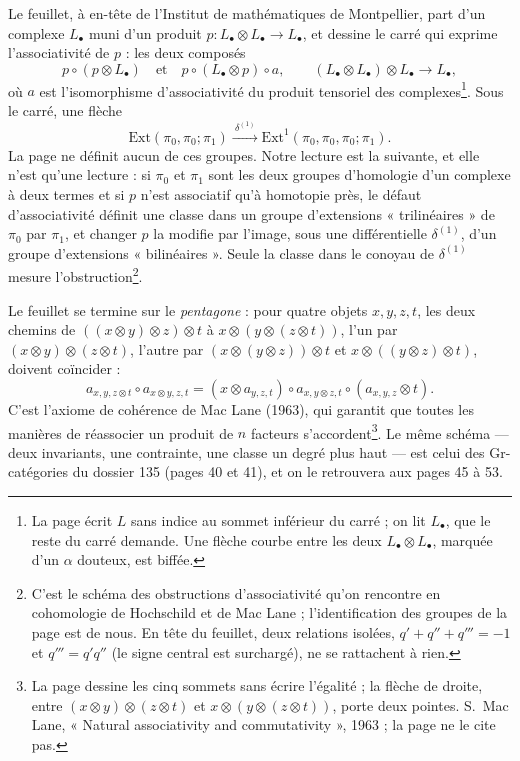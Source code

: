 \documentclass[11pt,a4paper]{article}
\begin{document}
Le feuillet, à en-tête de l'Institut de mathématiques de Montpellier, part
d'un complexe $L_{\bullet}$ muni d'un produit $p \colon L_{\bullet} \otimes
L_{\bullet} \to L_{\bullet}$, et dessine le carré qui exprime
l'associativité de $p$ : les deux composés
\[
p \circ (p \otimes L_{\bullet}) \quad \text{et} \quad
p \circ (L_{\bullet} \otimes p) \circ a,
\qquad
(L_{\bullet} \otimes L_{\bullet}) \otimes L_{\bullet} \longrightarrow
L_{\bullet},
\]
où $a$ est l'isomorphisme d'associativité du produit tensoriel des
complexes\footnote{La page écrit $L$ sans indice au sommet inférieur du
carré ; on lit $L_{\bullet}$, que le reste du carré demande. Une flèche
courbe entre les deux $L_{\bullet} \otimes L_{\bullet}$, marquée d'un
$\alpha$ douteux, est biffée.}. Sous le carré, une flèche
\[
\mathrm{Ext}(\pi_0, \pi_0 ; \pi_1) \xrightarrow{\ \delta^{(1)}\ }
\mathrm{Ext}^{1}(\pi_0, \pi_0, \pi_0 ; \pi_1).
\]
La page ne définit aucun de ces groupes. Notre lecture est la suivante, et
elle n'est qu'une lecture : si $\pi_0$ et $\pi_1$ sont les deux groupes
d'homologie d'un complexe à deux termes et si $p$ n'est associatif qu'à
homotopie près, le défaut d'associativité définit une classe dans un groupe
d'extensions « trilinéaires » de $\pi_0$ par $\pi_1$, et changer $p$ la
modifie par l'image, sous une différentielle $\delta^{(1)}$, d'un groupe
d'extensions « bilinéaires ». Seule la classe dans le conoyau de
$\delta^{(1)}$ mesure l'obstruction\footnote{C'est le schéma des
obstructions d'associativité qu'on rencontre en cohomologie de Hochschild
et de Mac Lane ; l'identification des groupes de la page est de nous. En
tête du feuillet, deux relations isolées, $q' + q'' + q''' = -1$ et
$q''' = q'q''$ (le signe central est surchargé), ne se rattachent à rien.}.

Le feuillet se termine sur le \emph{pentagone} : pour quatre objets
$x, y, z, t$, les deux chemins de $((x \otimes y) \otimes z) \otimes t$ à
$x \otimes (y \otimes (z \otimes t))$, l'un par $(x \otimes y) \otimes
(z \otimes t)$, l'autre par $(x \otimes (y \otimes z)) \otimes t$ et
$x \otimes ((y \otimes z) \otimes t)$, doivent coïncider :
\[
a_{x, y, z \otimes t} \circ a_{x \otimes y, z, t}
= (x \otimes a_{y, z, t}) \circ a_{x, y \otimes z, t} \circ
(a_{x, y, z} \otimes t).
\]
C'est l'axiome de cohérence de Mac Lane (1963), qui garantit que toutes les
manières de réassocier un produit de $n$ facteurs
s'accordent\footnote{La page dessine les cinq sommets sans écrire
l'égalité ; la flèche de droite, entre $(x \otimes y) \otimes (z \otimes t)$
et $x \otimes (y \otimes (z \otimes t))$, porte deux pointes. S.~Mac Lane,
« Natural associativity and commutativity », 1963 ; la page ne le cite
pas.}. Le même schéma — deux
invariants, une contrainte, une classe un degré plus haut — est celui des
Gr-catégories du dossier 135 (pages 40 et 41), et on le retrouvera aux pages
45 à 53.
\end{document}

